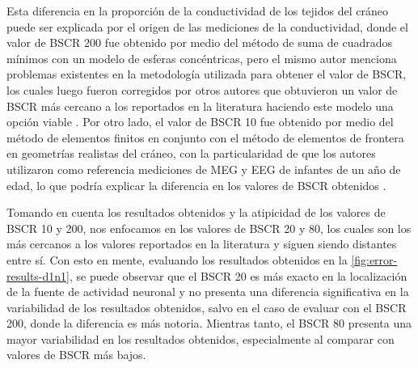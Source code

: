 Esta diferencia en la proporción de la conductividad de los tejidos del cráneo puede ser explicada por el origen de las mediciones de la conductividad, donde el valor de BSCR 200 fue obtenido por medio del método de suma de cuadrados mínimos con un modelo de esferas concéntricas, pero el mismo autor menciona problemas existentes en la metodología utilizada para obtener el valor de BSCR, los cuales luego fueron corregidos por otros autores que obtuvieron un valor de BSCR más cercano a los reportados en la literatura haciendo este modelo una opción viable \cite{eriksenVivoHumanHead1990, Gutierrez2004}. 
Por otro lado, el valor de BSCR 10 fue obtenido por medio del método de elementos finitos en conjunto con el método de elementos de frontera en geometrías realistas del cráneo, con la particularidad de que los autores utilizaron como referencia mediciones de MEG y EEG de infantes de un año de edad, lo que podría explicar la diferencia en los valores de BSCR obtenidos \cite{acarHighresolutionEEGSource2016}.

Tomando en cuenta los resultados obtenidos y la atipicidad de los valores de BSCR 10 y 200, nos enfocamos en los valores de BSCR 20 y 80, los cuales son los más cercanos a los valores reportados en la literatura y siguen siendo distantes entre sí. 
Con esto en mente, evaluando los resultados obtenidos en la \cref{fig:error-results-d1n1}, se puede observar que el BSCR 20 es más exacto en la localización de la fuente de actividad neuronal y no presenta una diferencia significativa en la variabilidad de los resultados obtenidos, salvo en el caso de evaluar con el BSCR 200, donde la diferencia es más notoria. 
Mientras tanto, el BSCR 80 presenta una mayor variabilidad en los resultados obtenidos, especialmente al comparar con valores de BSCR más bajos.  

